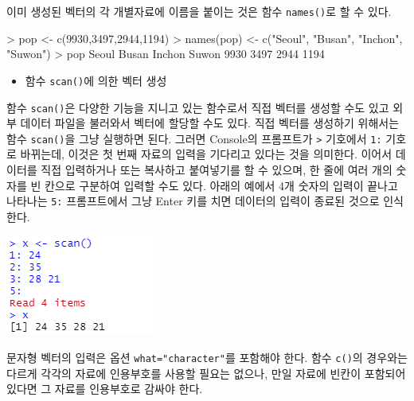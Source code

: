 \documentclass[
]{book}
\newenvironment{Shaded}{\begin{snugshade}}{\end{snugshade}}
\newcommand{\DecValTok}[1]{\textcolor[rgb]{0.00,0.00,0.81}{#1}}
\newcommand{\FunctionTok}[1]{\textcolor[rgb]{0.00,0.00,0.00}{#1}}
\newcommand{\NormalTok}[1]{#1}
\newcommand{\OtherTok}[1]{\textcolor[rgb]{0.56,0.35,0.01}{#1}}
\newcommand{\SpecialCharTok}[1]{\textcolor[rgb]{0.00,0.00,0.00}{#1}}
\newcommand{\StringTok}[1]{\textcolor[rgb]{0.31,0.60,0.02}{#1}}
\providecommand{\tightlist}{%
  \setlength{\itemsep}{0pt}\setlength{\parskip}{0pt}}
\begin{document}
이미 생성된 벡터의 각 개별자료에 이름을 붙이는 것은 함수 \texttt{names()}로 할 수 있다.

\begin{Shaded}
\begin{Highlighting}[]
\SpecialCharTok{\textgreater{}}\NormalTok{ pop }\OtherTok{\textless{}{-}} \FunctionTok{c}\NormalTok{(}\DecValTok{9930}\NormalTok{,}\DecValTok{3497}\NormalTok{,}\DecValTok{2944}\NormalTok{,}\DecValTok{1194}\NormalTok{)}
\SpecialCharTok{\textgreater{}} \FunctionTok{names}\NormalTok{(pop) }\OtherTok{\textless{}{-}} \FunctionTok{c}\NormalTok{(}\StringTok{"Seoul"}\NormalTok{, }\StringTok{"Busan"}\NormalTok{, }\StringTok{"Inchon"}\NormalTok{, }\StringTok{"Suwon"}\NormalTok{)}
\SpecialCharTok{\textgreater{}}\NormalTok{ pop}
\NormalTok{ Seoul  Busan Inchon  Suwon }
  \DecValTok{9930}   \DecValTok{3497}   \DecValTok{2944}   \DecValTok{1194} 
\end{Highlighting}
\end{Shaded}

\begin{itemize}
\tightlist
\item
  함수 \texttt{scan()}에 의한 벡터 생성
\end{itemize}

함수 \texttt{scan()}은 다양한 기능을 지니고 있는 함수로서 직접 벡터를 생성할 수도 있고 외부 데이터 파일을 불러와서 벡터에 할당할 수도 있다.
직접 벡터를 생성하기 위해서는 함수 \texttt{scan()}을 그냥 실행하면 된다.
그러면 Console의 프롬프트가 \texttt{\textgreater{}} 기호에서 \texttt{1:} 기호로 바뀌는데, 이것은 첫 번째 자료의 입력을 기다리고 있다는 것을 의미한다.
이어서 데이터를 직접 입력하거나 또는 복사하고 붙여넣기를 할 수 있으며, 한 줄에 여러 개의 숫자를 빈 칸으로 구분하여 입력할 수도 있다.
아래의 예에서 4개 숫자의 입력이 끝나고 나타나는 \texttt{5:} 프롬프트에서 그냥 Enter 키를 치면 데이터의 입력이 종료된 것으로 인식한다.

\includegraphics{Figure/scan_num.png}

문자형 벡터의 입력은 옵션 \texttt{what="character"}를 포함해야 한다.
함수 \texttt{c()}의 경우와는 다르게 각각의 자료에 인용부호를 사용할 필요는 없으나, 만일 자료에 빈칸이 포함되어 있다면 그 자료를 인용부호로 감싸야 한다.
\end{document}
